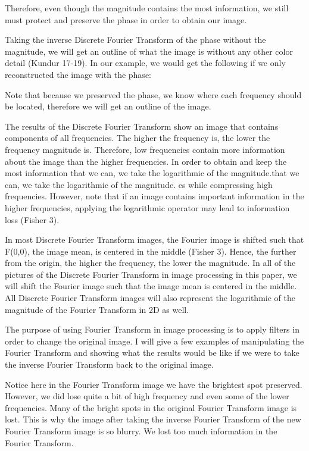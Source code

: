 \documentclass [../article.tex]{subfiles}
\begin{document}
  Therefore, even though the magnitude contains the most
  information, we still must protect and preserve the phase
  in order to obtain our image.

  Taking the inverse Discrete Fourier Transform of the phase
  without the magnitude, we will get an outline of what the image
  is without any other color detail (Kundur 17-19). In our example,
  we would get the following if we only reconstructed the image
  with the phase:

  Note that because we preserved the phase, we know where each
  frequency should be located, therefore we will get an outline
  of the image.

  The results of the Discrete Fourier Transform show an image
  that contains components of all frequencies.  The higher the
  frequency is, the lower the frequency magnitude is.  Therefore,
  low frequencies contain more information about the image than
  the higher frequencies.  In order to obtain and keep the most
  information that we can, we take the logarithmic of the
  magnitude.that we can, we take the logarithmic of the magnitude.
  es while compressing high frequencies.  However, note that if
  an image contains important information in the higher
  frequencies, applying the logarithmic operator may lead
  to information loss (Fisher 3).

  In most Discrete Fourier Transform images, the Fourier image is
  shifted such that F(0,0), the image mean, is centered in the
  middle (Fisher 3).  Hence, the further from the origin, the
  higher the frequency, the lower the magnitude.  In all of the
  pictures of the Discrete Fourier Transform in image processing in
  this paper, we will shift the Fourier image such that the image
  mean is centered in the middle.  All Discrete Fourier Transform
  images will also represent the logarithmic of the magnitude of the
  Fourier Transform in 2D as well.

  The purpose of using Fourier Transform in image processing is to
  apply filters in order to change the original image.  I will give
  a few examples of manipulating the Fourier Transform and  showing
  what the results would be like if we were to take the inverse
  Fourier Transform back to the original image.

  Notice here in the Fourier Transform image we have the brightest
  spot preserved.  However, we did lose quite a bit of high
  frequency and even some of the lower frequencies.  Many of the
  bright spots in the original Fourier Transform image is lost.
  This is why the image after taking the inverse Fourier Transform
  of the new Fourier Transform image is so blurry.  We lost too much
  information in the Fourier Transform.
\end{document}
